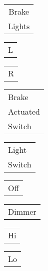 \documentclass{book}
\begin{document}
\stopmpxshipout
\mpxshipout%
{\small \renewcommand{\arraystretch}{.9}
                \circuitfont\begin{tabular}[t]{@{}c}
                   Brake \\  Lights
	        \end{tabular}}%
\stopmpxshipout
\mpxshipout%
{\small \renewcommand{\arraystretch}{.9}
                \circuitfont\begin{tabular}[t]{@{}r@{}}
                   L
	        \end{tabular}}%
\stopmpxshipout
\mpxshipout%
{\small \renewcommand{\arraystretch}{.9}
                \circuitfont\begin{tabular}[t]{@{}r@{}}
                   R
	        \end{tabular}}%
\stopmpxshipout
\mpxshipout%
{\small \renewcommand{\arraystretch}{.9}
                \circuitfont\begin{tabular}[b]{@{}l}
                   Brake \\ Actuated \\ Switch
	        \end{tabular}}%
\stopmpxshipout
\mpxshipout%
{\small \renewcommand{\arraystretch}{.9}
                \circuitfont\begin{tabular}[b]{@{}l@{}}
                   Light \\ Switch
	        \end{tabular}}%
\stopmpxshipout
\mpxshipout%
{\small \renewcommand{\arraystretch}{.9}
                \circuitfont\begin{tabular}{@{}r@{}}
                   Off
	        \end{tabular}}%
\stopmpxshipout
\mpxshipout%
{\small \renewcommand{\arraystretch}{.9}
                \circuitfont\begin{tabular}[b]{@{}l@{}}
                   Dimmer
	        \end{tabular}}%
\stopmpxshipout
\mpxshipout%
{\small \renewcommand{\arraystretch}{.9}
                \circuitfont\begin{tabular}{@{}l@{}}
                   Hi
	        \end{tabular}}%
\stopmpxshipout
\mpxshipout%
{\small \renewcommand{\arraystretch}{.9}
                \circuitfont\begin{tabular}{@{}r@{}}
                   Lo
	        \end{tabular}}%
\end{document}
